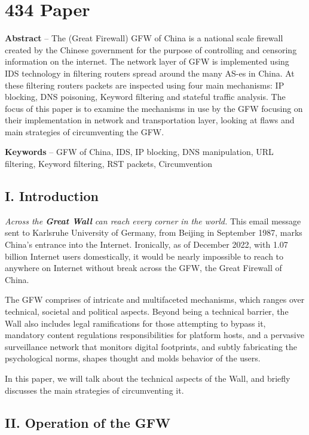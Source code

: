 \hypertarget{paper}{%
\section{434 Paper}\label{paper}}

\textbf{Abstract} -- The (Great Firewall) GFW of China is a national
scale firewall created by the Chinese government for the purpose of
controlling and censoring information on the internet. The network layer
of GFW is implemented using IDS technology in filtering routers spread
around the many AS-es in China. At these filtering routers packets are
inspected using four main mechanisms: IP blocking, DNS poisoning,
Keyword filtering and stateful traffic analysis. The focus of this paper
is to examine the mechanisms in use by the GFW focusing on their
implementation in network and transportation layer, looking at flaws and
main strategies of circumventing the GFW.

\textbf{Keywords} -- GFW of China, IDS, IP blocking, DNS manipulation,
URL filtering, Keyword filtering, RST packets, Circumvention

\hypertarget{i.-introduction}{%
\subsection{I. Introduction}\label{i.-introduction}}

\emph{Across the \textbf{Great Wall} can reach every corner in the
world.} \cite{01_hist1986} This email message sent to Karlsruhe
University of Germany, from Beijing in September 1987, marks China's
entrance into the Internet. Ironically, as of December 2022, with 1.07
billion Internet users domestically, \cite{02_stat2022} it would be
nearly impossible to reach to anywhere on Internet without break across
the GFW, the Great Firewall of China.

The GFW comprises of intricate and multifaceted mechanisms, which ranges
over technical, societal and political aspects. Beyond being a technical
barrier, the Wall also includes legal ramifications for those attempting
to bypass it, mandatory content regulations responsibilities for
platform hosts, and a pervasive surveillance network that monitors
digital footprints, and subtly fabricating the psychological norms,
shapes thought and molds behavior of the users.

In this paper, we will talk about the technical aspects of the Wall, and
briefly discusses the main strategies of circumventing it.

\hypertarget{ii.-operation-of-the-gfw}{%
\subsection{II. Operation of the GFW}\label{ii.-operation-of-the-gfw}}

